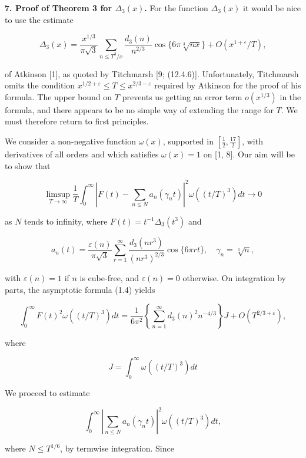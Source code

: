 \documentclass[10pt]{article}
\newcommand{\articleSection}[2]{%
  \par\medskip\noindent\textbf{#1. #2.}\enspace
}
\begin{document}
\articleSection{7}{Proof of Theorem 3 for $\Delta_{3}(x)$}For the function $\Delta_{3}(x)$ it would be nice to use the estimate

$$
\Delta_{3}(x)=\frac{x^{1 / 3}}{\pi \sqrt{3}} \sum_{n \leq T^{3} / x} \frac{d_{3}(n)}{n^{2 / 3}} \cos \{6 \pi \sqrt[3]{n x}\}+O\left(x^{1+\varepsilon} / T\right),
$$

of Atkinson [1], as quoted by Titchmarsh [9; (12.4.6)]. Unfortunately, Titchmarsh omits the condition $x^{1 / 2+\varepsilon} \leq T \leq x^{2 / 3-\varepsilon}$ required by Atkinson for the proof of his formula. The upper bound on $T$ prevents us getting an error term $o\left(x^{1 / 3}\right)$ in the formula, and there appears to be no simple way of extending the range for $T$. We must therefore return to first principles.

We consider a non-negative function $\omega(x)$, supported in $\left[\frac{1}{2}, \frac{17}{2}\right]$, with derivatives of all orders and which satisfies $\omega(x)=1$ on [1, 8]. Our aim will be to show that

$$
\limsup _{T \rightarrow \infty} \frac{1}{T} \int_{0}^{\infty}\left|F(t)-\sum_{n \leq N} a_{n}\left(\gamma_{n} t\right)\right|^{2} \omega\left((t / T)^{3}\right) d t \rightarrow 0
$$

as $N$ tends to infinity, where $F(t)=t^{-1} \Delta_{3}\left(t^{3}\right)$ and

$$
a_{n}(t)=\frac{\varepsilon(n)}{\pi \sqrt{3}} \sum_{r=1}^{\infty} \frac{d_{3}\left(n r^{3}\right)}{\left(n r^{3}\right)^{2 / 3}} \cos \{6 \pi r t\}, \quad \gamma_{n}=\sqrt[3]{n},
$$

with $\varepsilon(n)=1$ if $n$ is cube-free, and $\varepsilon(n)=0$ otherwise. On integration by parts, the asymptotic formula (1.4) yields


\begin{equation*}
\int_{0}^{\infty} F(t)^{2} \omega\left((t / T)^{3}\right) d t=\frac{1}{6 \pi^{2}}\left\{\sum_{n=1}^{\infty} d_{3}(n)^{2} n^{-4 / 3}\right\} J+O\left(T^{2 / 3+\varepsilon}\right), \tag{7.1}
\end{equation*}


where

$$
J=\int_{0}^{\infty} \omega\left((t / T)^{3}\right) d t
$$

We proceed to estimate

$$
\int_{0}^{\infty}\left|\sum_{n \leq N} a_{n}\left(\gamma_{n} t\right)\right|^{2} \omega\left((t / T)^{3}\right) d t,
$$

where $N \leq T^{1 / 6}$, by termwise integration. Since
\end{document}
